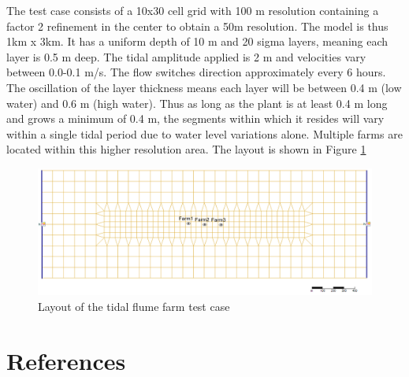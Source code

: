 \documentclass{deltares_manual}
\begin{document}
The test case consists of a 10x30 cell grid with 100 m resolution containing a factor 2 refinement  in the center to obtain a 50m resolution. The model is thus 1km x 3km. It has a uniform depth of 10 m and 20 sigma layers, meaning each layer is 0.5 m deep. The tidal amplitude applied is 2 m and velocities vary between 0.0-0.1 m/s. The flow switches direction approximately every 6 hours. The oscillation of the layer thickness means each layer will be between 0.4 m (low water) and 0.6 m (high water). Thus as long as the plant is at least 0.4 m long and grows a minimum of 0.4 m, the segments within which it resides will vary within a single tidal period due to water level variations alone. Multiple farms are located within this higher resolution area. The layout is shown in Figure \ref{fig:tidalflumefarm}

\begin{figure}[H]
	\centering
	\includegraphics[width=1\linewidth]{figures/tidal_flume_farm}
	\caption{Layout of the tidal flume farm test case}
	\label{fig:tidalflumefarm}
\end{figure}


\chapter{References}

\end{document}
